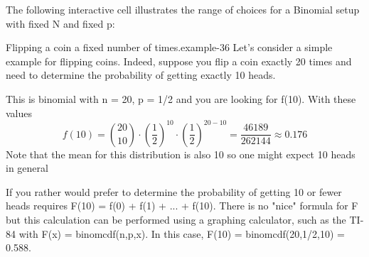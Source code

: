 \documentclass[10pt,]{book}
\numberwithin{equation}{section}
\begin{document}
\hypertarget{p-894}{}%
The following interactive cell illustrates the range of choices for a Binomial setup with fixed N and fixed p:%
\par
\hypertarget{p-895}{}%
\leavevmode%
%
\begin{example}{Flipping a coin a fixed number of times.}{example-36}%
\hypertarget{p-896}{}%
Let's consider a simple example for flipping coins. Indeed, suppose you flip a coin exactly 20 times and need to determine the probability of getting exactly 10 heads.%
\par
\hypertarget{p-897}{}%
This is binomial with n = 20, p = 1/2 and you are looking for f(10). With these values%
\begin{equation*}
f(10) = \binom{20}{10} \cdot \left ( \frac{1}{2} \right )^{10} \cdot \left ( \frac{1}{2} \right 	)^{20-10} = \frac{46189}{262144} \approx 0.176
\end{equation*}
Note that the mean for this distribution is also 10 so one might expect 10 heads in general%
\par
\hypertarget{p-898}{}%
If you rather would prefer to determine the probability of getting 10 or fewer heads requires F(10) = f(0) + f(1) + ... + f(10). There is no "nice" formula for F but this calculation can be performed using a graphing calculator, such as the TI-84 with F(x) = binomcdf(n,p,x). In this case, F(10) = binomcdf(20,1/2,10) = 0.588.%
\end{example}
\end{document}
